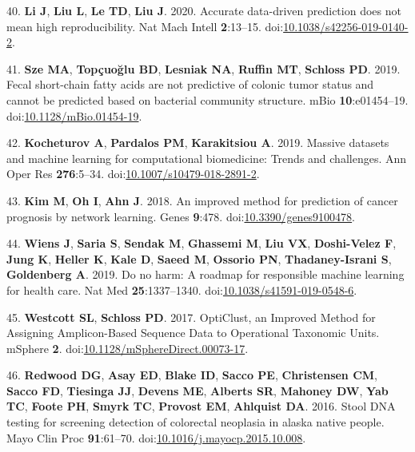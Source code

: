 \documentclass[11pt,]{article}
\begin{document}
\hypertarget{ref-li_accurate_2020}{}
40. \textbf{Li J}, \textbf{Liu L}, \textbf{Le TD}, \textbf{Liu J}. 2020.
Accurate data-driven prediction does not mean high reproducibility. Nat
Mach Intell \textbf{2}:13--15.
doi:\href{https://doi.org/10.1038/s42256-019-0140-2}{10.1038/s42256-019-0140-2}.

\hypertarget{ref-sze_fecal_2019}{}
41. \textbf{Sze MA}, \textbf{Topçuoğlu BD}, \textbf{Lesniak NA},
\textbf{Ruffin MT}, \textbf{Schloss PD}. 2019. Fecal short-chain fatty
acids are not predictive of colonic tumor status and cannot be predicted
based on bacterial community structure. mBio \textbf{10}:e01454--19.
doi:\href{https://doi.org/10.1128/mBio.01454-19}{10.1128/mBio.01454-19}.

\hypertarget{ref-kocheturov_massive_2019}{}
42. \textbf{Kocheturov A}, \textbf{Pardalos PM}, \textbf{Karakitsiou A}.
2019. Massive datasets and machine learning for computational
biomedicine: Trends and challenges. Ann Oper Res \textbf{276}:5--34.
doi:\href{https://doi.org/10.1007/s10479-018-2891-2}{10.1007/s10479-018-2891-2}.

\hypertarget{ref-kim_improved_2018}{}
43. \textbf{Kim M}, \textbf{Oh I}, \textbf{Ahn J}. 2018. An improved
method for prediction of cancer prognosis by network learning. Genes
\textbf{9}:478.
doi:\href{https://doi.org/10.3390/genes9100478}{10.3390/genes9100478}.

\hypertarget{ref-wiens_no_2019}{}
44. \textbf{Wiens J}, \textbf{Saria S}, \textbf{Sendak M},
\textbf{Ghassemi M}, \textbf{Liu VX}, \textbf{Doshi-Velez F},
\textbf{Jung K}, \textbf{Heller K}, \textbf{Kale D}, \textbf{Saeed M},
\textbf{Ossorio PN}, \textbf{Thadaney-Israni S}, \textbf{Goldenberg A}.
2019. Do no harm: A roadmap for responsible machine learning for health
care. Nat Med \textbf{25}:1337--1340.
doi:\href{https://doi.org/10.1038/s41591-019-0548-6}{10.1038/s41591-019-0548-6}.

\hypertarget{ref-westcott_opticlust_2017}{}
45. \textbf{Westcott SL}, \textbf{Schloss PD}. 2017. OptiClust, an
Improved Method for Assigning Amplicon-Based Sequence Data to
Operational Taxonomic Units. mSphere \textbf{2}.
doi:\href{https://doi.org/10.1128/mSphereDirect.00073-17}{10.1128/mSphereDirect.00073-17}.

\hypertarget{ref-redwood_stool_2016}{}
46. \textbf{Redwood DG}, \textbf{Asay ED}, \textbf{Blake ID},
\textbf{Sacco PE}, \textbf{Christensen CM}, \textbf{Sacco FD},
\textbf{Tiesinga JJ}, \textbf{Devens ME}, \textbf{Alberts SR},
\textbf{Mahoney DW}, \textbf{Yab TC}, \textbf{Foote PH}, \textbf{Smyrk
TC}, \textbf{Provost EM}, \textbf{Ahlquist DA}. 2016. Stool DNA testing
for screening detection of colorectal neoplasia in alaska native people.
Mayo Clin Proc \textbf{91}:61--70.
doi:\href{https://doi.org/10.1016/j.mayocp.2015.10.008}{10.1016/j.mayocp.2015.10.008}.
\end{document}
